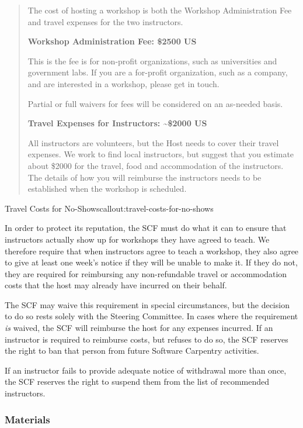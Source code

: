 \begin{quote}
The cost of hosting a workshop is both the Workshop Administration Fee
and travel expenses for the two instructors.

\textbf{Workshop Administration Fee: \$2500 US}

This is the fee is for non-profit organizations, such as universities
and government labs. If you are a for-profit organization, such as a
company, and are interested in a workshop, please get in touch.

Partial or full waivers for fees will be considered on an as-needed
basis.

\textbf{Travel Expenses for Instructors: \textasciitilde{}\$2000 US}

All instructors are volunteers, but the Host needs to cover their travel
expenses. We work to find local instructors, but suggest that you
estimate about \$2000 for the travel, food and accommodation of the
instructors. The details of how you will reimburse the instructors needs
to be established when the workshop is scheduled.
\end{quote}

\begin{callout}{Travel Costs for No-Shows}{callout:travel-costs-for-no-shows}

In order to protect its reputation, the SCF must do what it can to
ensure that instructors actually show up for workshops they have agreed
to teach. We therefore require that when instructors agree to teach a
workshop, they also agree to give at least one week's notice if they
will be unable to make it. If they do not, they are required for
reimbursing any non-refundable travel or accommodation costs that the
host may already have incurred on their behalf.

The SCF may waive this requirement in special circumstances, but the
decision to do so rests solely with the Steering Committee. In cases
where the requirement \emph{is} waived, the SCF will reimburse the host
for any expenses incurred. If an instructor is required to reimburse
costs, but refuses to do so, the SCF reserves the right to ban that
person from future Software Carpentry activities.

If an instructor fails to provide adequate notice of withdrawal more
than once, the SCF reserves the right to suspend them from the list of
recommended instructors.
\end{callout}

\subsubsection{Materials}\label{materials}

